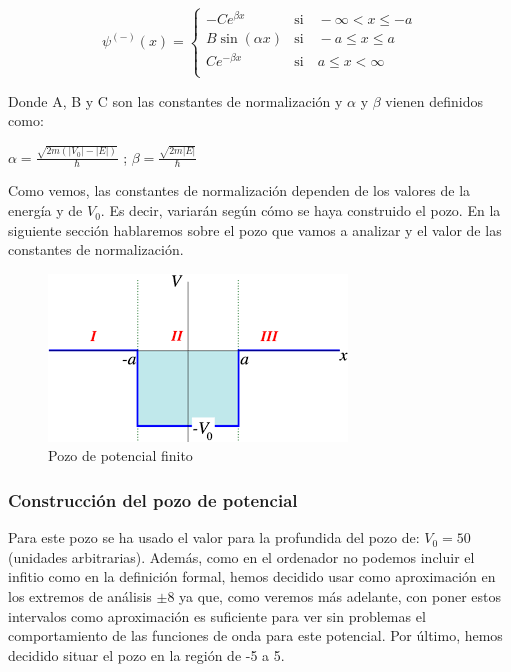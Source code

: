 \documentclass[12pt]{article}
\begin{document}
\begin{equation}
    \boxed{\psi^{(-)}(x)=\begin{cases} 
        -C e^{\beta x} & \text{si} \quad -\infty < x \leq -a \\
        B\sin(\alpha x) & \text{si} \quad -a\leq x \leq a \\
        C e^{-\beta x} & \text{si} \quad a \leq x < \infty \\
     \end{cases}}
\end{equation}

Donde A, B y C son las constantes de normalización y $\alpha$ y $\beta$ vienen definidos como: 

\begin{center}
    $\alpha=\frac{\sqrt{2m(\left\lvert V_0 \right\rvert-\left\lvert E \right\rvert)}}{\hbar}$
\hspace{0.3cm};\hspace{0.3cm} $\beta=\frac{\sqrt{2m\left\lvert E \right\rvert}}{\hbar}$ 
\end{center}

Como vemos, las constantes de normalización dependen de los  valores de la energía y de $V_0$. Es decir, variarán según cómo se haya construido el pozo. En la siguiente sección hablaremos sobre el pozo que vamos a analizar y el valor de las constantes de normalización.

\begin{figure}[H]
    \centering
    \includegraphics[width=0.7\linewidth]{images.png}
    \caption{Pozo de potencial finito}
\end{figure}

\subsubsection{Construcción del pozo de potencial}
Para este pozo se ha usado el valor para la profundida del pozo
de: $V_0=50$ (unidades arbitrarias). Además, como en el ordenador
no podemos incluir el infitio como en la definición formal, hemos 
decidido usar como aproximación en los extremos de análisis $\pm 8$ ya
que, como veremos más adelante, con poner estos intervalos como
aproximación es suficiente para ver sin problemas el comportamiento
de las funciones de onda para este potencial. Por último, hemos decidido situar el pozo en la región de -5 a 5.\\
\end{document}
